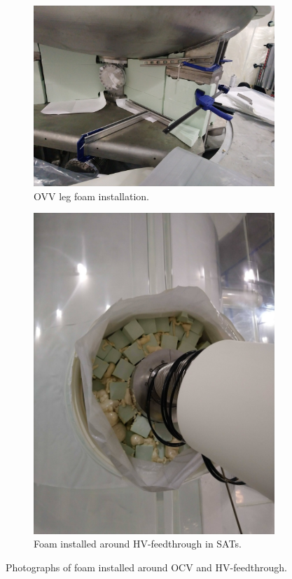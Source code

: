 \begin{figure}[!htbp]
\begin{subfigure}{.5\textwidth}
  \centering
  \includegraphics[width=\linewidth]{Figures/Construction/BAT_green_foam.JPG}
  \caption{OVV leg foam installation.}
  \label{fig:ocv_leg_foam}
  \end{subfigure}
  \begin{subfigure}{.5\textwidth}
  \centering
  \includegraphics[width=\linewidth]{Figures/Construction/HV_foam.jpg}
  \caption{Foam installed around HV-feedthrough in SATs.}
  \label{fig:hv_port_foam}
  \end{subfigure}
\caption{Photographs of foam installed around OCV and HV-feedthrough.}
\label{fig:Additional_foam_installation}
\end{figure}

